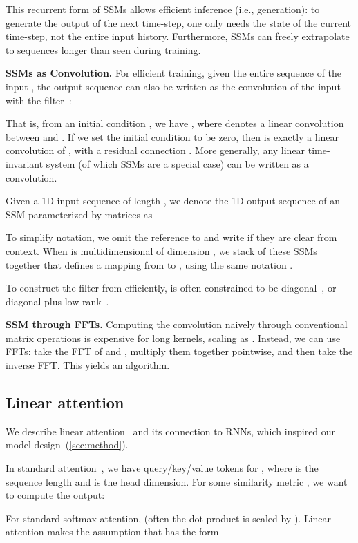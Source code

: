 \documentclass{article}
\begin{document}
This recurrent form of SSMs allows efficient inference (i.e., generation): to
generate the output of the next time-step, one only needs the state of the
current time-step, not the entire input history.
Furthermore, SSMs can freely extrapolate to sequences longer than seen during training.

\textbf{SSMs as Convolution.}
For efficient training, given the
entire sequence of the input , the output sequence
 can also be written as the convolution of the input with the
filter~\citep{gu2021combining}:

That is, from an initial condition , we have
, where  denotes a
linear convolution between  and .
If we set the initial condition  to be zero, then  is exactly a
linear convolution of , with a residual connection .
More generally, any linear time-invariant system (of which SSMs are a special case) can
be written as a convolution.

Given a 1D input sequence  of length , we denote the 1D output
sequence  of an SSM parameterized by matrices  as

To simplify notation, we omit the reference to  and write
 if they are clear from context.
When  is multidimensional of dimension , we stack  of these SSMs
together that defines a mapping from  to , using
the same notation .

To construct the filter  from  efficiently,  is often constrained to
be diagonal~\citep{gupta2022diagonal,gu2022parameterization}, or diagonal plus
low-rank~\citep{gu2022efficiently}.

\textbf{SSM through FFTs.}
Computing the convolution naively through conventional matrix operations is expensive
for long kernels, scaling as .
Instead, we can use FFTs: take the FFT of  and , multiply them together pointwise, and then take the inverse FFT.
This yields an  algorithm.

\subsection{Linear attention}

We describe linear attention~\citep{katharopoulos2020transformers} and its connection to RNNs, which inspired our model design~(\cref{sec:method}).

In standard attention~\citep{vaswani2017attention}, we have  query/key/value tokens  for
, where  is the sequence length and  is the head dimension.
For some similarity metric , we want to compute the output:

For standard softmax attention,  (often the dot
product is scaled by ).
Linear attention makes the assumption that  has the form
\end{document}
